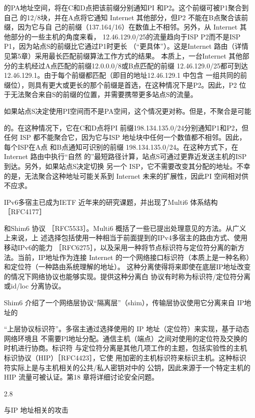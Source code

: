 的PA地址空间，将在C和D点把该前缀分别通知PI 和P2。这个前缀可被P1聚合到自己
的12/8块，并在A点将它通知 Internet 其他部分，但P2 不能在B点聚合该前缀，因为它与自
己的前缀（137.164/16）在数值上不相邻。另外，从 Internet 其他部分的一些主机的角度来看，
12.46.129.0/25的流量趋向于ISP P2而不是ISP P1，因为站点S的前缀比它通过P1时更长
（“更具体”）。这是Internet 路由（详情见第5章）采用最长匹配前缀算法工作方式的结果。
本质上，一台Internet 其他部分的主机经过A点匹配的前缀12.0.0.0/8或B点匹配的前缀
12.46.129.0/25都可到达12.46.129.1。由于每个前缀都匹配（即目的地址12.46.129.1 中包含
一组共同的前缀位），则具有更大或更长的那个前缀是首选，在这种情况下是P2。因此，P2
位于无法聚合来自S的前缀的位置，并需要携带更多站点S的流量。

如果站点S决定使用PI空间而不是PA空间，这个情况更对称。但是，不聚合是可能

的。在这种情况下，它在C和D点将PI 前缀198.134.135.0/24分别通知P1和P2，但任何
ISP 都不能聚合它，因为它与ISP 地址块中任何一个数值都不相邻。因此，每个ISP在A点
和B点通知可识别的前缀 198.134.135.0/24。在这种方式下，在Internet 路由中执行“自然
的”最短路径计算，站点S可通过更靠近发送主机的ISP 到达。另外，如果站点S决定切换
另一个 ISP，它不需要改变其分配的地址。不幸的是，无法聚合这种地址可能关系到 Internet
未来的扩展性，因此PI 空间相对供不应求。

IPv6多宿主已成为IETF 近年来的研究课题，并出现了Multi6 体系结构［RFC4177］

和Shim6 协议 ［RFC5533］。Multi6 概括了一些已提出处理意见的方法。从广义上来说，上
述选择包括使用一种相当于前面提到的IPv4多宿主的路由方式、使用移动IPv6的能力
［RFC6275］，以及采用一种将节点标识符与定位符分离的新方法。当前，IP地址作为连接
Internet 的一个网络接口标识符（本质上是一种名称）和定位符（一种路由系统理解的地址）。
这种分离使得将来即使在底层IP地址改变的情况下网络协议也能够实现。提供这种分离白
协议有时称为标识符/定位符分离或id/loc 分离协议。

Shim6 介绍了一个网络层协议“隔离层”（shim），传输层协议使用它分离来自 IP地址的

“上层协议标识符”。多宿主通过选择使用的 IP 地址（定位符）来实现，基于动态网络环境且
不需要PI地址分配。通信主机（端点）之间对使用的定位符及交换的时机进行协商。标识符
与定位符分离是其他几项工作的主题，包括实验性的主机标识协议（HIP）［RFC4423］，它使
用加密的主机标识符来标识主机。这种标识符实际上是与主机相关的公共/私人密钥对中的
公钥，因此来源于一个特定主机的HIP 流量可被认证。第18 章将详细讨论安全问题。

2.8

与IP 地址相关的攻击

